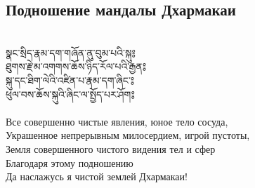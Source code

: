 \subsection{Подношение мандалы Дхармакаи}
\\
\ti
སྣང་སྲིད་རྣམ་དག་གཞོན་ནུ་བུམ་པའི་སྐུ༔ \\
ཐུགས་རྗེ་མ་འགགས་ཆོས་ཉིད་རོལ་པའི་རྒྱན༔\\
སྐུ་དང་ཐིག་ལེའི་འཛིན་པ་རྣམ་དག་ཞིང་༔\\
ཕུལ་བས་ཆོས་སྐུའི་ཞིང་ལ་སྤྱོད་པར་ཤོག༔\\
\\
\ru
Все совершенно чистые явления, юное тело сосуда,\\
Украшенное непрерывным милосердием, игрой пустоты,\\
Земля совершенного чистого видения тел и сфер\\
Благодаря этому подношению\\
Да наслажусь я чистой землей Дхармакаи!\\

